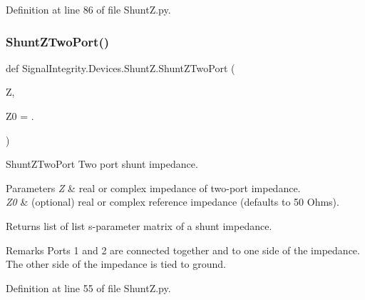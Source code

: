 Definition at line 86 of file Shunt\+Z.\+py.

\mbox{\label{namespaceSignalIntegrity_1_1Devices_1_1ShuntZ_a632e682133ebf3a6d617516e754f9125}} 
\subsubsection{\texorpdfstring{Shunt\+Z\+Two\+Port()}{ShuntZTwoPort()}}
{\footnotesize\ttfamily def Signal\+Integrity.\+Devices.\+Shunt\+Z.\+Shunt\+Z\+Two\+Port (\begin{DoxyParamCaption}\item[{}]{Z,  }\item[{}]{Z0 = {.} }\end{DoxyParamCaption})}



Shunt\+Z\+Two\+Port Two port shunt impedance. 


\begin{DoxyParams}{Parameters}
{\em Z} & real or complex impedance of two-\/port impedance. \\
\hline
{\em Z0} & (optional) real or complex reference impedance (defaults to 50 Ohms). \\
\hline
\end{DoxyParams}
\begin{DoxyReturn}{Returns}
list of list s-\/parameter matrix of a shunt impedance.~\newline
 
\end{DoxyReturn}
\begin{DoxyRemark}{Remarks}
Ports 1 and 2 are connected together and to one side of the impedance.~\newline
 The other side of the impedance is tied to ground. 
\end{DoxyRemark}


Definition at line 55 of file Shunt\+Z.\+py.

